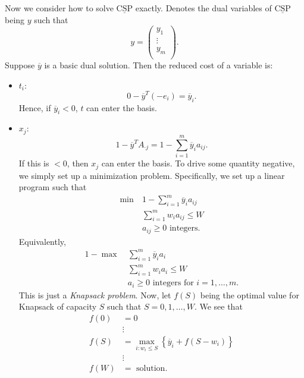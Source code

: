 \begin{problem}
\begin{answer}
	Now we consider how to solve \(\mathrm{\underline{CSP}}\) exactly. Denotes the dual variables of \(\mathrm{\underline{CSP}}\) being \(y\)
	such that
	\[
		y = \begin{pmatrix}
			y_1    \\
			\vdots \\
			y_{m}  \\
		\end{pmatrix}.
	\]
	Suppose \(\overline{y}\) is a basic dual solution. Then the reduced cost of a variable is:
	\begin{itemize}
		\item \(t_{i}\):
		      \[
			      0 - \overline{y}^{T}(-e_{i}) = \overline{y}_{i}.
		      \]
		      Hence, if \(\overline{y}_{i}<0\), \(t\) can enter the basis.
		\item \(x_{j}\):
		      \[
			      1 - \overline{y}^{T}A_{\cdot j} = 1 - \sum\limits_{i=1}^{m} \overline{y}_{i}a_{ij}.
		      \]
		      If this is \(<0\), then \(x_{j}\) can enter the basis. To drive some quantity negative, we simply set up a minimization problem.
		      Specifically, we set up a linear program such that
		      \begin{align*}
			      \min~ & 1 - \sum\limits_{i=1}^{m} \overline{y}_{i}a_{ij} \\
			            & \sum\limits_{i=1}^{m} w_{i}a_{ij}\leq W          \\
			            & a_{ij}\geq 0 \text{ integers}.
		      \end{align*}
		      Equivalently,
		      \begin{align*}
			      1 - \max~ & \sum\limits_{i=1}^{m} \overline{y}_{i}a_{i}         \\
			                & \sum\limits_{i=1}^{m} w_{i}a_{i}\leq W              \\
			                & a_{i}\geq 0 \text{ integers for }i = 1, \ldots , m.
		      \end{align*}
		      This is just a \emph{Knapsack problem}. Now, let \(f(S)\) being the optimal value for Knapsack of capacity \(S\) such that
		      \(S = 0, 1, \ldots , W\). We see that
		      \[
			      \begin{split}
				      f(0) &= 0\\
				      &\vdots\\
				      f(S) &= \max_{i\colon w_{i}\leq S}\left\{ \overline{y}_{i} + f(S - w_{i})\right\}\\
				      &\vdots\\
				      f(W) &= \text{ solution}.\\

\end{split}\]
\end{itemize}
\end{answer}
\end{problem}
